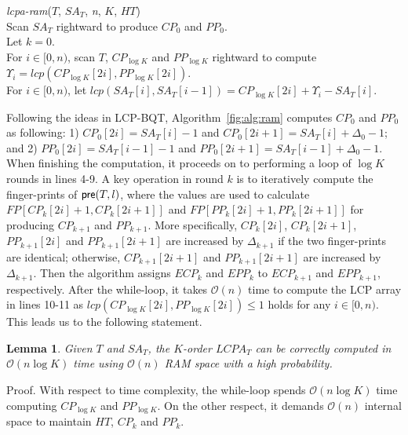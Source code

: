 \documentclass{llncs}
\newtheorem{lem}{Lemma}
\begin{document}
\begin{algorithm}[hbtp!]
\caption{Compute $K$-Order $LCPA_T$ in RAM}
\label{fig:alg:ram}
{\em lcpa-ram}($T$, $SA_T$, {\em n}, $K$, $HT$){\\
\SetAlgoNoLine
Scan $SA_T$ rightward to produce $CP_0$ and $PP_0$. \\
Let $k = 0$. \\
\While{$k < \log K$}{
\Indentp{-1em}
Radix-sort $CP_k$ and $PP_k$ to produce $ICP_k$ and $IPP_k$. \\
For $i\in [0,n)$, scan $T$ rightward to compute the finger-print of ${\sf pre}(T,i)$ and let $FP[0,i]=HT[i]$ if $i\in \{ICP_k[j] \cup IPP_k[j], j\in[0,2n)\}$. \\
For $i\in [0,n)$, scan $CP_k$ and $PP_k$ rightward to compute and compare $FP[CP_k[2i]+1,CP_k[2i+1]]$ and $FP[PP_k[2i]+1,PP_k[2i+1]]$ for generating $CP_{k+1}$ and $PP_{k+1}$. \\
Let $k = k +1$ and clear $HT$. \\
}
For $i\in [0,n)$, scan $T$, $CP_{\log K}$ and $PP_{\log K}$ rightward to compute $\Upsilon_i = lcp(CP_{\log K}[2i],PP_{\log K}[2i])$. \\
For $i\in [0,n)$, let $lcp(SA_T[i],SA_T[i-1])=CP_{\log K}[2i] +\Upsilon_i-SA_T[i]$. \\
}
\end{algorithm}

Following the ideas in {LCP-BQT}, Algorithm~\ref{fig:alg:ram} computes $CP_0$ and $PP_0$ as following: 1) $CP_0[2i]=SA_T[i]-1$ and $CP_0[2i+1]=SA_T[i]+ \Delta_0 - 1$; and 2) $PP_0[2i]=SA_T[i-1]-1$ and $PP_0[2i+1]=SA_T[i-1]+ \Delta_0 - 1$. When finishing the computation, it proceeds on to performing a loop of $\log K$ rounds in lines 4-9. A key operation in round $k$ is to iteratively compute the finger-prints of ${\sf pre}(T,l)$, where the values are used to calculate $FP[CP_k[2i]+1,CP_k[2i+1]]$ and $FP[PP_k[2i]+1,PP_k[2i+1]]$ for producing $CP_{k+1}$ and $PP_{k+1}$. More specifically, $CP_{k}[2i]$, $CP_{k}[2i+1]$, $PP_{k+1}[2i]$ and $PP_{k+1}[2i+1]$ are increased by $\Delta_{k+1}$ if the two finger-prints are identical; otherwise, $CP_{k+1}[2i+1]$ and $PP_{k+1}[2i+1]$ are increased by $\Delta_{k+1}$. Then the algorithm assigns $ECP_k$ and $EPP_k$ to $ECP_{k+1}$ and $EPP_{k+1}$, respectively. After the while-loop, it takes $\mathcal{O}(n)$ time to compute the {LCP} array in lines 10-11 as $lcp(CP_{\log K}[2i],PP_{\log K}[2i]) \le 1$ holds for any $i \in [0,n)$. This leads us to the following statement.

\begin{lem}
\label{thm:lcp:ram}
Given $T$ and $SA_T$, the $K$-order $LCPA_T$ can be correctly computed in $\mathcal{O}(n\log K)$ time using $\mathcal{O}(n)$ {RAM} space with a high probability.
\end{lem}
Proof. With respect to time complexity, the while-loop spends $\mathcal{O}(n\log K)$ time computing $CP_{\log K}$ and $PP_{\log K}$. On the other respect, it demands $\mathcal{O}(n)$ internal space to maintain $HT$, $CP_k$ and $PP_k$.
\end{document}
